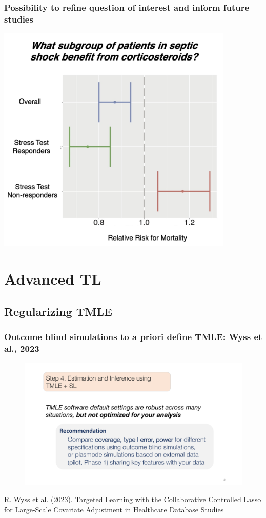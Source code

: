 \documentclass[t]{beamer}
\begin{document}
\begin{frame}
  \frametitle{Possibility to refine question of interest and inform future studies}
  \vspace{-11pt}
  \begin{center}
  \includegraphics[width = 0.85\textwidth]{figures/subgroup.png}
  \end{center}
\end{frame}

\section{Advanced TL}

\subsection{Regularizing TMLE}

\begin{frame}
\frametitle{Outcome blind simulations to a priori define TMLE: Wyss et al., 2023}
\centering
\begin{figure}
\begin{center}
\includegraphics[width=1.02\textwidth]{figures/abbviepdfslides_2.pdf}
\end{center}
\end{figure}
{\small R. Wyss et al. (2023). Targeted Learning with the Collaborative
Controlled Lasso for Large-Scale Covariate Adjustment in Healthcare Database
Studies}
\end{frame}
\end{document}
